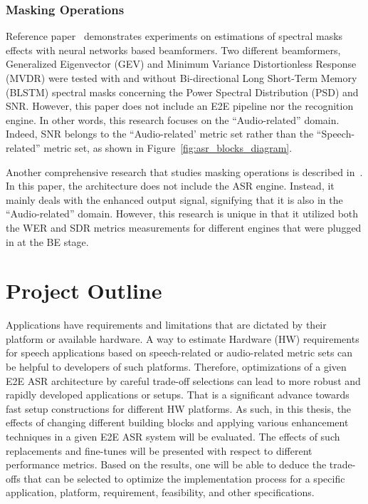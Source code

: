 \subsubsection{Masking Operations}
Reference paper~\cite{7471664} demonstrates experiments on estimations of spectral masks effects
with neural networks based beamformers.
Two different beamformers,  Generalized Eigenvector (GEV)
and Minimum Variance Distortionless Response (MVDR) were tested with and without Bi-directional Long Short-Term Memory (BLSTM)
spectral masks concerning the Power Spectral Distribution (PSD)
and SNR.
However, this paper does not include an E2E pipeline nor the recognition engine.
In other words, this research focuses on the ``Audio-related'' domain.
Indeed, SNR belongs to the
``Audio-related' metric set rather than the
``Speech-related'' metric set,
as shown in Figure~\ref{fig:asr_blocks_diagram}.
\bigskip

Another comprehensive research 
that studies masking operations
is described in~\cite{8466865}.
In this paper, the architecture does not include
the ASR engine. 
Instead, it mainly deals with the enhanced output signal,
signifying that it is also in the ``Audio-related'' domain.
However, this research is unique in that
it utilized both the WER and SDR metrics measurements
for different engines that were plugged in at the BE stage.



\section{Project Outline}
Applications have requirements and limitations
that are dictated by their platform or available hardware.
A way to estimate Hardware (HW) requirements for speech
applications based on speech-related or audio-related metric sets
can be helpful to developers of such platforms.
Therefore, optimizations of a given E2E ASR architecture by careful
trade-off selections can lead to more robust and rapidly
developed applications or setups.
That is a significant advance towards fast setup constructions for different HW platforms.
As such, in this thesis, the effects of changing different
building blocks and applying various enhancement techniques
in a given E2E ASR system will be evaluated.
The effects of such replacements and
fine-tunes will be presented with respect to different
performance metrics. Based on the results, one will be able to deduce the trade-offs
that can be selected to optimize the implementation process for a specific
application, platform, requirement, feasibility, and other specifications.

